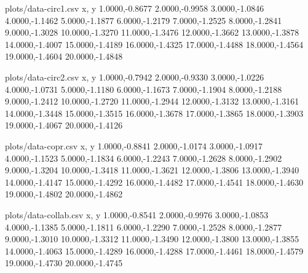 \documentclass[a4paper, openany, oneside]{memoir}
\begin{document}
\begin{filecontents*}{plots/data-circ1.csv}
x, y
1.0000,-0.8677
2.0000,-0.9958
3.0000,-1.0846
4.0000,-1.1462
5.0000,-1.1877
6.0000,-1.2179
7.0000,-1.2525
8.0000,-1.2841
9.0000,-1.3028
10.0000,-1.3270
11.0000,-1.3476
12.0000,-1.3662
13.0000,-1.3878
14.0000,-1.4007
15.0000,-1.4189
16.0000,-1.4325
17.0000,-1.4488
18.0000,-1.4564
19.0000,-1.4604
20.0000,-1.4848
\end{filecontents*}

\begin{filecontents*}{plots/data-circ2.csv}
x, y
1.0000,-0.7942
2.0000,-0.9330
3.0000,-1.0226
4.0000,-1.0731
5.0000,-1.1180
6.0000,-1.1673
7.0000,-1.1904
8.0000,-1.2188
9.0000,-1.2412
10.0000,-1.2720
11.0000,-1.2944
12.0000,-1.3132
13.0000,-1.3161
14.0000,-1.3448
15.0000,-1.3515
16.0000,-1.3678
17.0000,-1.3865
18.0000,-1.3903
19.0000,-1.4067
20.0000,-1.4126
\end{filecontents*}

\begin{filecontents*}{plots/data-copr.csv}
x, y
1.0000,-0.8841
2.0000,-1.0174
3.0000,-1.0917
4.0000,-1.1523
5.0000,-1.1834
6.0000,-1.2243
7.0000,-1.2628
8.0000,-1.2902
9.0000,-1.3204
10.0000,-1.3418
11.0000,-1.3621
12.0000,-1.3806
13.0000,-1.3940
14.0000,-1.4147
15.0000,-1.4292
16.0000,-1.4482
17.0000,-1.4541
18.0000,-1.4630
19.0000,-1.4802
20.0000,-1.4862
\end{filecontents*}

\begin{filecontents*}{plots/data-collab.csv}
x, y
1.0000,-0.8541
2.0000,-0.9976
3.0000,-1.0853
4.0000,-1.1385
5.0000,-1.1811
6.0000,-1.2290
7.0000,-1.2528
8.0000,-1.2877
9.0000,-1.3010
10.0000,-1.3312
11.0000,-1.3490
12.0000,-1.3800
13.0000,-1.3855
14.0000,-1.4063
15.0000,-1.4289
16.0000,-1.4288
17.0000,-1.4461
18.0000,-1.4579
19.0000,-1.4730
20.0000,-1.4745
\end{filecontents*}
\end{document}
